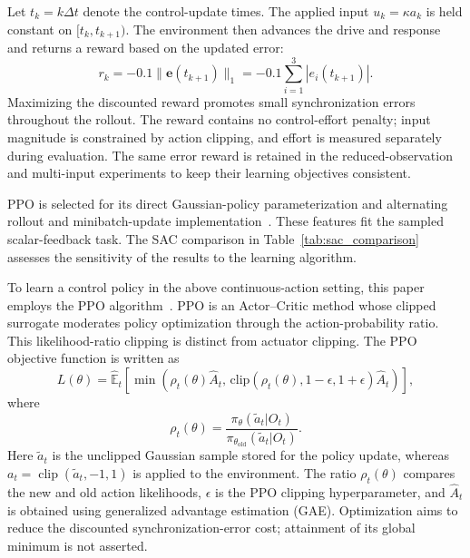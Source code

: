\documentclass[a4paper,fleqn]{cas-sc}
\theoremstyle{plain}
\theoremstyle{definition}
\begin{document}
Let $t_k=k\Delta t$ denote the control-update times. The applied input $u_k=\kappa a_k$ is held constant on $[t_k,t_{k+1})$. The environment then advances the drive and response and returns a reward based on the updated error:
\begin{equation}
	r_k
	=
	-0.1\|\mathbf{e}(t_{k+1})\|_1
	=
	-0.1\sum_{i=1}^{3}|e_i(t_{k+1})|.
	\label{eq:reward_function}
\end{equation}
Maximizing the discounted reward promotes small synchronization errors throughout the rollout. The reward contains no control-effort penalty; input magnitude is constrained by action clipping, and effort is measured separately during evaluation. The same error reward is retained in the reduced-observation and multi-input experiments to keep their learning objectives consistent.

PPO is selected for its direct Gaussian-policy parameterization and alternating rollout and minibatch-update implementation~\cite{schulman2017proximal}. These features fit the sampled scalar-feedback task. The SAC comparison in Table~\ref{tab:sac_comparison} assesses the sensitivity of the results to the learning algorithm.

To learn a control policy in the above continuous-action setting, this paper employs the PPO algorithm~\cite{schulman2017proximal}. PPO is an Actor--Critic method whose clipped surrogate moderates policy optimization through the action-probability ratio. This likelihood-ratio clipping is distinct from actuator clipping. The PPO objective function is written as
\begin{equation}
	L(\theta)
	=
	\hat{\mathbb{E}}_t
	\left[
	\min
	\left(
	\rho_t(\theta)\hat{A}_t,\,
	\mathrm{clip}
	\left(
	\rho_t(\theta),1-\epsilon,1+\epsilon
	\right)
	\hat{A}_t
	\right)
	\right],
	\label{eq:ppo_objective}
\end{equation}
where
\begin{equation}
	\rho_t(\theta)
	=
	\frac{\pi_\theta(\widetilde a_t|O_t)}
	{\pi_{\theta_{\mathrm{old}}}(\widetilde a_t|O_t)}.
	\label{eq:ppo_ratio}
\end{equation}
Here $\widetilde a_t$ is the unclipped Gaussian sample stored for the policy update, whereas $a_t=\operatorname{clip}(\widetilde a_t,-1,1)$ is applied to the environment. The ratio $\rho_t(\theta)$ compares the new and old action likelihoods, $\epsilon$ is the PPO clipping hyperparameter, and $\hat A_t$ is obtained using generalized advantage estimation (GAE). Optimization aims to reduce the discounted synchronization-error cost; attainment of its global minimum is not asserted.
\end{document}
